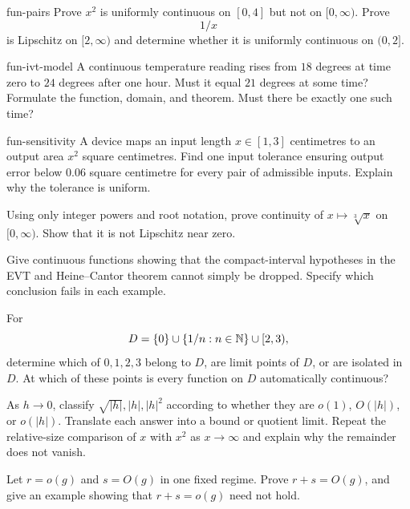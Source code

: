 \begin{hexercise}{fun-pairs}
Prove $x^2$ is uniformly continuous on $[0,4]$ but not on $[0,\infty)$. Prove
\[
1/x
\]
 is Lipschitz on $[2,\infty)$ and determine whether it is uniformly continuous on $(0,2]$.
\end{hexercise}

\begin{hexercise}{fun-ivt-model}
A continuous temperature reading rises from $18$ degrees at time zero to $24$ degrees after one hour. Must it equal $21$ degrees at some time? Formulate the function, domain, and theorem. Must there be exactly one such time?
\end{hexercise}

\begin{hexercise}{fun-sensitivity}
A device maps an input length $x\in[1,3]$ centimetres to an output area $x^2$ square centimetres. Find one input tolerance ensuring output error below $0.06$ square centimetre for every pair of admissible inputs. Explain why the tolerance is uniform.
\end{hexercise}

\begin{exercise}
Using only integer powers and root notation, prove continuity of $x\mapsto\sqrt[3]{x}$ on $[0,\infty)$. Show that it is not Lipschitz near zero.
\end{exercise}

\begin{exercise}
Give continuous functions showing that the compact-interval hypotheses in the EVT and Heine--Cantor theorem cannot simply be dropped. Specify which conclusion fails in each example.
\end{exercise}

\begin{exercise}
For
\[
D=\{0\}\cup\{1/n:n\in\mathbb{N}\}\cup[2,3),
\]
 determine which of
$0,1,2,3$ belong to $D$, are limit points of $D$, or are isolated in $D$.
At which of these points is every function on $D$ automatically continuous?
\end{exercise}
\begin{exercise}
As $h\to0$, classify $\sqrt{|h|},|h|,|h|^2$ according to whether they
are $o(1)$, $O(|h|)$, or $o(|h|)$. Translate each answer into a bound
or quotient limit. Repeat the relative-size comparison of $x$ with
$x^2$ as $x\to\infty$ and explain why the remainder does not vanish.
\end{exercise}
\begin{exercise}
Let $r=o(g)$ and $s=O(g)$ in one fixed regime. Prove $r+s=O(g)$,
and give an example showing that $r+s=o(g)$ need not hold.
\end{exercise}

